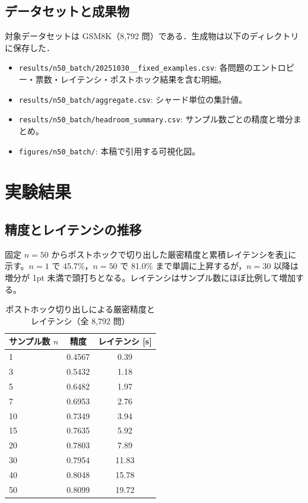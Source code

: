 \documentclass{ipsj}
\begin{document}
\subsection{データセットと成果物}
対象データセットは GSM8K（8,792 問）である．生成物は以下のディレクトリに保存した．
\begin{itemize}
  \item \texttt{results/n50\_batch/20251030\_\*\_fixed\_examples.csv}: 各問題のエントロピー・票数・レイテンシ・ポストホック結果を含む明細。
  \item \texttt{results/n50\_batch/aggregate.csv}: シャード単位の集計値。
  \item \texttt{results/n50\_batch/headroom\_summary.csv}: サンプル数ごとの精度と増分まとめ。
  \item \texttt{figures/n50\_batch/}: 本稿で引用する可視化図。
\end{itemize}

\section{実験結果}
\subsection{精度とレイテンシの推移}
固定 $n=50$ からポストホックで切り出した厳密精度と累積レイテンシを表\ref{tab:accuracy}に示す。$n=1$ で 45.7\%，$n=50$ で 81.0\% まで単調に上昇するが，$n=30$ 以降は増分が 1pt 未満で頭打ちとなる。レイテンシはサンプル数にほぼ比例して増加する。

\begin{table}[tb]
  \caption{ポストホック切り出しによる厳密精度とレイテンシ（全 8,792 問）}
  \label{tab:accuracy}
  \centering
  \begin{tabular}{@{}lcc@{}}
    \toprule
    サンプル数 $n$ & 精度 & レイテンシ [s] \\
    \midrule
    1 & 0.4567 & 0.39 \\
    3 & 0.5432 & 1.18 \\
    5 & 0.6482 & 1.97 \\
    7 & 0.6953 & 2.76 \\
    10 & 0.7349 & 3.94 \\
    15 & 0.7635 & 5.92 \\
    20 & 0.7803 & 7.89 \\
    30 & 0.7954 & 11.83 \\
    40 & 0.8048 & 15.78 \\
    50 & 0.8099 & 19.72 \\
    \bottomrule
  \end{tabular}
\end{table}
\end{document}

